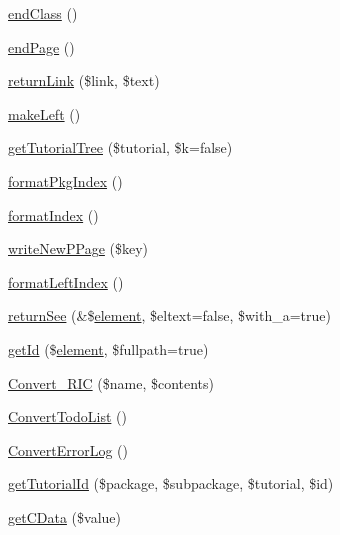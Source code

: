 \begin{DoxyCompactItemize}
\item 
\hyperlink{class_h_t_m_lframes_converter_ae4962a5674fd1be0f3795cb72f2974bf}{end\-Class} ()
\item 
\hyperlink{class_h_t_m_lframes_converter_a7e7c9e2e7d88f78fa6f8bf8776c443e5}{end\-Page} ()
\item 
\hyperlink{class_h_t_m_lframes_converter_af40fcd39ab514ae82e555a451dd72dc2}{return\-Link} (\$link, \$text)
\item 
\hyperlink{class_h_t_m_lframes_converter_aad3f0d3857e7995a1ede44d9b901e2d4}{make\-Left} ()
\item 
\hyperlink{class_h_t_m_lframes_converter_ad57d358bc8174edac88585e8a51d9010}{get\-Tutorial\-Tree} (\$tutorial, \$k=false)
\item 
\hyperlink{class_h_t_m_lframes_converter_a37200c9f589ee4eaeed637c5ce1af356}{format\-Pkg\-Index} ()
\item 
\hyperlink{class_h_t_m_lframes_converter_a963f73984fad30cb1776cd293eeb7db7}{format\-Index} ()
\item 
\hyperlink{class_h_t_m_lframes_converter_a6b7e21b9959092d614a9c07a447c2643}{write\-New\-P\-Page} (\$key)
\item 
\hyperlink{class_h_t_m_lframes_converter_a39bb30299ec5d6ba31096e51f2bcc4b4}{format\-Left\-Index} ()
\item 
\hyperlink{class_h_t_m_lframes_converter_a016c461f5a37e15d2a431c7083c904a3}{return\-See} (\&\$\hyperlink{bug-904820_8php_aa94081298ab2dfd0f261cce6c203d9aa}{element}, \$eltext=false, \$with\-\_\-a=true)
\item 
\hyperlink{class_h_t_m_lframes_converter_a5308a5a2e0656a3300684dde375b2e41}{get\-Id} (\$\hyperlink{bug-904820_8php_aa94081298ab2dfd0f261cce6c203d9aa}{element}, \$fullpath=true)
\item 
\hyperlink{class_h_t_m_lframes_converter_ad3f7aa571c77bab78c11f387be1ec587}{\-Convert\-\_\-\-R\-I\-C} (\$name, \$contents)
\item 
\hyperlink{class_h_t_m_lframes_converter_a756b83c7febf175624cf1d2562bf02ae}{\-Convert\-Todo\-List} ()
\item 
\hyperlink{class_h_t_m_lframes_converter_a5a02e88d6dba03b66f46fd411e5ac2c2}{\-Convert\-Error\-Log} ()
\item 
\hyperlink{class_h_t_m_lframes_converter_a98de4e6484c42e491de454411f606871}{get\-Tutorial\-Id} (\$package, \$subpackage, \$tutorial, \$id)
\item 
\hyperlink{class_h_t_m_lframes_converter_a37fe6f6ddd1cd15d360788064dce7a43}{get\-C\-Data} (\$value)
\item 

\end{DoxyCompactItemize}
